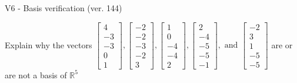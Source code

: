 \begin{exercise}
  \begin{exerciseTitle}V6 - Basis verification (ver. 144)\end{exerciseTitle}
  \begin{exerciseStatement}
    Explain why the vectors \(\left[\begin{array}{r}
4 \\
-3 \\
-3 \\
0 \\
1
\end{array}\right] , \left[\begin{array}{r}
-2 \\
-2 \\
-3 \\
-2 \\
3
\end{array}\right] , \left[\begin{array}{r}
1 \\
0 \\
-4 \\
-4 \\
2
\end{array}\right] , \left[\begin{array}{r}
2 \\
-4 \\
-5 \\
-5 \\
-1
\end{array}\right] , \text{ and } \left[\begin{array}{r}
-2 \\
3 \\
1 \\
-5 \\
-5
\end{array}\right]\) are or are not a basis of \(\mathbb{R}^5\)	



\end{exerciseStatement}
\end{exercise}
